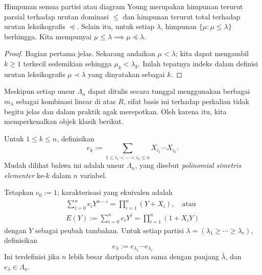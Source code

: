 \begin{proposition}\label{prop:dominance-lex-order}
	Himpunan semua partisi atau diagram Young merupakan himpunan terurut parsial terhadap urutan dominasi $\leq$ dan himpunan terurut total terhadap urutan leksikografis $\preceq$. Selain itu, untuk setiap $\lambda$, himpunan $\{\mu: \mu \leq \lambda \}$ berhingga. Kita mempunyai $\mu \leq \lambda \implies \mu \preceq \lambda$.
\end{proposition}
\begin{proof}
	Bagian pertama jelas. Sekarang andaikan $\mu < \lambda$; kita dapat mengambil $k \geq 1$ terkecil sedemikian sehingga $\mu_k < \lambda_k$. Inilah tepatnya indeks dalam definisi urutan leksikografis $\mu \prec \lambda$ yang dinyatakan sebagai $k$.
\end{proof}

Meskipun setiap unsur $\Lambda_n$ dapat ditulis secara tunggal menggunakan berbagai $m_\lambda$ sebagai kombinasi linear di atas $R$, sifat basis ini terhadap perkalian tidak begitu jelas dan dalam praktik agak merepotkan. Oleh karena itu, kita memperkenalkan objek klasik berikut.
\begin{definition}\label{def:elementary-symm-poly}
	Untuk $1 \leq k \leq n$, definisikan
	\[ e_k := \sum_{1 \leq i_1 < \cdots < i_k \leq n} X_{i_1} \cdots X_{i_k}. \]
	Mudah dilihat bahwa ini adalah unsur $\Lambda_n$, yang disebut \emph{polinomial simetris elementer} ke-$k$ dalam $n$ variabel.
\end{definition}
Tetapkan $e_0 := 1$; karakterisasi yang ekuivalen adalah
\begin{gather*}
	\sum_{i=0}^n e_i Y^{n-i} = \prod_{i=1}^n (Y + X_i), \quad \text{atau} \\
	E(Y) := \sum_{i=0}^n e_i Y^i = \prod_{i=1}^n (1 + X_i Y)
\end{gather*}
dengan $Y$ sebagai peubah tambahan. Untuk setiap partisi $\lambda = (\lambda_1 \geq \cdots \geq \lambda_r)$, definisikan
\[ e_\lambda := e_{\lambda_1} \cdots e_{\lambda_r} \]
Ini terdefinisi jika $n$ lebih besar daripada atau sama dengan panjang $\bar{\lambda}$, dan $e_\lambda \in \Lambda_n$.

